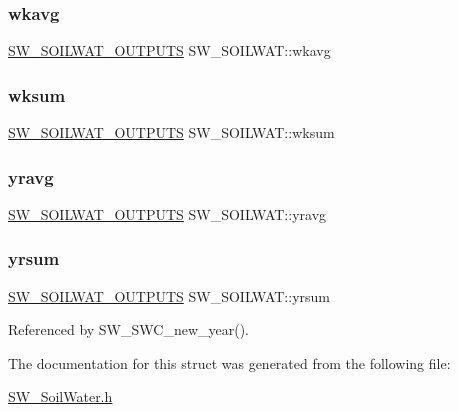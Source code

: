 \subsubsection{\texorpdfstring{wkavg}{wkavg}}
{\footnotesize\ttfamily \hyperlink{struct_s_w___s_o_i_l_w_a_t___o_u_t_p_u_t_s}{S\+W\+\_\+\+S\+O\+I\+L\+W\+A\+T\+\_\+\+O\+U\+T\+P\+U\+TS} S\+W\+\_\+\+S\+O\+I\+L\+W\+A\+T\+::wkavg}

\mbox{\label{struct_s_w___s_o_i_l_w_a_t_a50c9180d0925a21ae999cf82a90281f3}} 
\subsubsection{\texorpdfstring{wksum}{wksum}}
{\footnotesize\ttfamily \hyperlink{struct_s_w___s_o_i_l_w_a_t___o_u_t_p_u_t_s}{S\+W\+\_\+\+S\+O\+I\+L\+W\+A\+T\+\_\+\+O\+U\+T\+P\+U\+TS} S\+W\+\_\+\+S\+O\+I\+L\+W\+A\+T\+::wksum}

\mbox{\label{struct_s_w___s_o_i_l_w_a_t_a473caf3a53aaf6fcbf786dcd69358cff}} 
\subsubsection{\texorpdfstring{yravg}{yravg}}
{\footnotesize\ttfamily \hyperlink{struct_s_w___s_o_i_l_w_a_t___o_u_t_p_u_t_s}{S\+W\+\_\+\+S\+O\+I\+L\+W\+A\+T\+\_\+\+O\+U\+T\+P\+U\+TS} S\+W\+\_\+\+S\+O\+I\+L\+W\+A\+T\+::yravg}

\mbox{\label{struct_s_w___s_o_i_l_w_a_t_a56d7bbf038b877fcd89e25afeac5e13c}} 
\subsubsection{\texorpdfstring{yrsum}{yrsum}}
{\footnotesize\ttfamily \hyperlink{struct_s_w___s_o_i_l_w_a_t___o_u_t_p_u_t_s}{S\+W\+\_\+\+S\+O\+I\+L\+W\+A\+T\+\_\+\+O\+U\+T\+P\+U\+TS} S\+W\+\_\+\+S\+O\+I\+L\+W\+A\+T\+::yrsum}



Referenced by S\+W\+\_\+\+S\+W\+C\+\_\+new\+\_\+year().



The documentation for this struct was generated from the following file\+:\begin{DoxyCompactItemize}
\item 
\hyperlink{_s_w___soil_water_8h}{S\+W\+\_\+\+Soil\+Water.\+h}\end{DoxyCompactItemize}
